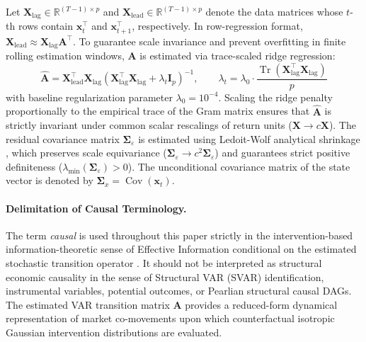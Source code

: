 \documentclass[review,12pt,authoryear]{elsarticle}
\begin{document}
Let $\mathbf{X}_{\text{lag}} \in \mathbb{R}^{(T-1) \times p}$ and $\mathbf{X}_{\text{lead}} \in \mathbb{R}^{(T-1) \times p}$ denote the data matrices whose $t$-th rows contain $\mathbf{x}_t^\top$ and $\mathbf{x}_{t+1}^\top$, respectively. In row-regression format, $\mathbf{X}_{\text{lead}} \approx \mathbf{X}_{\text{lag}}\mathbf{A}^\top$. To guarantee scale invariance and prevent overfitting in finite rolling estimation windows, $\mathbf{A}$ is estimated via trace-scaled ridge regression:
\begin{equation}
\hat{\mathbf{A}} = \mathbf{X}_{\text{lead}}^\top \mathbf{X}_{\text{lag}} \left( \mathbf{X}_{\text{lag}}^\top \mathbf{X}_{\text{lag}} + \lambda_t \mathbf{I}_p \right)^{-1}, \qquad \lambda_t = \lambda_0 \cdot \frac{\operatorname{Tr}(\mathbf{X}_{\text{lag}}^\top \mathbf{X}_{\text{lag}})}{p}
\label{eq:scaled_ridge}
\end{equation}
with baseline regularization parameter $\lambda_0 = 10^{-4}$. Scaling the ridge penalty proportionally to the empirical trace of the Gram matrix ensures that $\hat{\mathbf{A}}$ is strictly invariant under common scalar rescalings of return units ($\mathbf{X} \to c\mathbf{X}$). The residual covariance matrix $\boldsymbol{\Sigma}_\varepsilon$ is estimated using Ledoit-Wolf analytical shrinkage \citep{ledoit2004well}, which preserves scale equivariance ($\boldsymbol{\Sigma}_\varepsilon \to c^2 \boldsymbol{\Sigma}_\varepsilon$) and guarantees strict positive definiteness ($\lambda_{\min}(\boldsymbol{\Sigma}_\varepsilon) > 0$). The unconditional covariance matrix of the state vector is denoted by $\boldsymbol{\Sigma}_x = \operatorname{Cov}(\mathbf{x}_t)$.

\paragraph{Delimitation of Causal Terminology.}
The term \emph{causal} is used throughout this paper strictly in the intervention-based information-theoretic sense of Effective Information conditional on the estimated stochastic transition operator \citep{hoel2013quantifying, liu2024exact}. It should not be interpreted as structural economic causality in the sense of Structural VAR (SVAR) identification, instrumental variables, potential outcomes, or Pearlian structural causal DAGs. The estimated VAR transition matrix $\mathbf{A}$ provides a reduced-form dynamical representation of market co-movements upon which counterfactual isotropic Gaussian intervention distributions are evaluated.
\end{document}
